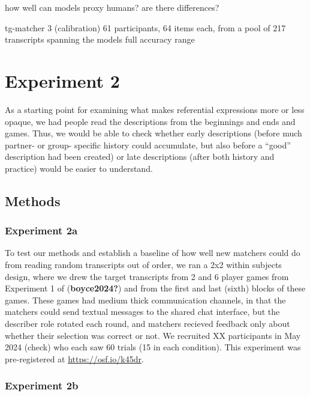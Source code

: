 \documentclass[10pt, letterpaper]{article}
\begin{document}
how well can models proxy humans? are there differences?

tg-matcher 3 (calibration) 61 participants, 64 items each, from a pool
of 217 transcripts spanning the models full accuracy range

\section{Experiment 2}\label{experiment-2}

As a starting point for examining what makes referential expressions
more or less opaque, we had people read the descriptions from the
beginnings and ends and games. Thus, we would be able to check whether
early descriptions (before much partner- or group- specific history
could accumulate, but also before a ``good'' description had been
created) or late descriptions (after both history and practice) would be
easier to understand.

\subsection{Methods}\label{methods}

\subsubsection{Experiment 2a}\label{experiment-2a}

To test our methods and establish a baseline of how well new matchers
could do from reading random transcripts out of order, we ran a 2x2
within subjects design, where we drew the target transcripts from 2 and
6 player games from Experiment 1 of (\textbf{boyce2024?}) and from the
first and last (sixth) blocks of these games. These games had medium
thick communication channels, in that the matchers could send textual
messages to the shared chat interface, but the describer role rotated
each round, and matchers recieved feedback only about whether their
selection was correct or not. We recruited XX participants in May 2024
(check) who each saw 60 trials (15 in each condition). This experiment
was pre-registered at \url{https://osf.io/k45dr}.

\subsubsection{Experiment 2b}\label{experiment-2b}
\end{document}

